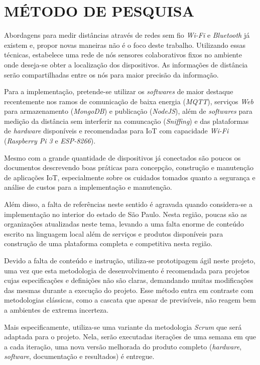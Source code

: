
\chapter{MÉTODO DE PESQUISA}
\label{chap:MÉTODO DE PESQUISA}

Abordagens para medir distâncias através de redes sem fio \textit{Wi-Fi}
\cite{bahillo2009ieee} e \textit{Bluetooth} já existem e, propor novas maneiras
não é o foco deste trabalho. Utilizando essas técnicas, estabelece uma
rede de nós sensores colaborativos fixos no ambiente onde deseja-se obter a
localização dos dispositivos. As informações de distância serão compartilhadas
entre os nós para maior precisão da informação.

Para a implementação, pretende-se utilizar os \textit{softwares} de maior
destaque recentemente nos ramos de comunicação de baixa energia (\textit{MQTT}),
serviços \textit{Web} para armazenamento (\textit{MongoDB}) e publicação
(\textit{NodeJS}), além de \textit{softwares} para medição da distância sem
interferir na comuncação (\textit{Sniffing}) e das plataformas de
\textit{hardware} disponíveis e recomendadas para IoT com capacidade
\textit{Wi-Fi} (\textit{Raspberry Pi 3} e \textit{ESP-8266}).

Mesmo com a grande quantidade de dispositivos já conectados são poucos os
documentos descrevendo boas práticas para concepção, construção e manutenção de
aplicações IoT, especialmente sobre os cuidados tomados quanto a segurança e
análise de custos para a implementação e manutenção.

Além disso, a falta de referências neste sentido é agravada quando considera-se
a implementação no interior do estado de São Paulo. Nesta região, poucas são as
organizações atualizadas neste tema, levando a uma falta enorme de conteúdo
escrito na linguagem local além de serviços e produtos disponíveis para
construção de uma plataforma completa e competitiva nesta região.

Devido a falta de conteúdo e instrução, utiliza-se prototipagem ágil neste
projeto, uma vez que esta metodologia de desenvolvimento é recomendada para
projetos cujas especificações e definições não são claras, demandando muitas
modificações das mesmas durante a execução do projeto. Esse método entra em
contraste com metodologias clássicas, como a cascata que apesar de previsíveis,
não reagem bem a ambientes de extrema incerteza.

Mais especificamente, utiliza-se uma variante da metodologia \textit{Scrum}
\cite{James2016} que será adaptada para o projeto. Nela, serão executadas
iterações de uma semana em que a cada iteração, uma nova versão melhorada do
produto completo (\textit{hardware}, \textit{software}, documentação e
resultados) é entregue.

